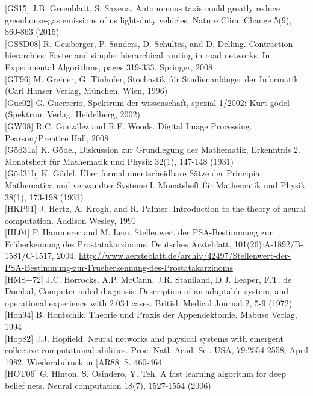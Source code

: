 \documentclass[10pt]{article}
\begin{document}
[GS15] J.B. Greenblatt, S. Saxena, Autonomous taxis could greatly reduce greenhouse-gas emissions of us light-duty vehicles. Nature Clim. Change 5(9), 860-863 (2015)\\[0pt]
[GSSD08] R. Geisberger, P. Sanders, D. Schultes, and D. Delling. Contraction hierarchies: Faster and simpler hierarchical routing in road networks. In Experimental Algorithms, pages 319-333. Springer, 2008\\[0pt]
[GT96] M. Greiner, G. Tinhofer, Stochastik für Studienanfänger der Informatik (Carl Hanser Verlag, München, Wien, 1996)\\[0pt]
[Gue02] G. Guerrerio, Spektrum der wissenschaft, spezial 1/2002: Kurt gödel (Spektrum Verlag, Heidelberg, 2002)\\[0pt]
[GW08] R.C. González and R.E. Woods. Digital Image Processing. Pearson/Prentice Hall, 2008\\[0pt]
[Göd31a] K. Gödel, Diskussion zur Grundlegung der Mathematik, Erkenntnis 2. Monatsheft für Mathematik und Physik 32(1), 147-148 (1931)\\[0pt]
[Göd31b] K. Gödel, Über formal unentscheidbare Sätze der Principia Mathematica und verwandter Systeme I. Monatsheft für Mathematik und Physik 38(1), 173-198 (1931)\\[0pt]
[HKP91] J. Hertz, A. Krogh, and R. Palmer. Introduction to the theory of neural computation. Addison Wesley, 1991\\[0pt]
[HL04] P. Hammerer and M. Lein. Stellenwert der PSA-Bestimmung zur Früherkennung des Prostatakarzinoms. Deutsches Ärzteblatt, 101(26):A-1892/B-1581/C-1517, 2004. \href{http://www.aerzteblatt.de/archiv/42497/Stellenwert-der-PSA-Bestimmung-zur-Frueherkennung-des-Prostatakarzinoms}{http://www.aerzteblatt.de/archiv/42497/Stellenwert-der-PSA-Bestimmung-zur-Frueherkennung-des-Prostatakarzinoms}\\[0pt]
[HMS+72] J.C. Horrocks, A.P. McCann, J.R. Staniland, D.J. Leaper, F.T. de Dombal, Computer-aided diagnosis: Description of an adaptable system, and operational experience with 2.034 cases. British Medical Journal 2, 5-9 (1972)\\[0pt]
[Hon94] B. Hontschik. Theorie und Praxis der Appendektomie. Mabuse Verlag, 1994\\[0pt]
[Hop82] J.J. Hopfield. Neural networks and physical systems with emergent collective computational abilities. Proc. Natl. Acad. Sci. USA, 79:2554-2558, April 1982. Wiederabdruck in [AR88] S. 460-464\\[0pt]
[HOT06] G. Hinton, S. Osindero, Y. Teh, A fast learning algorithm for deep belief nets. Neural computation 18(7), 1527-1554 (2006)\\[0pt]
\end{document}
